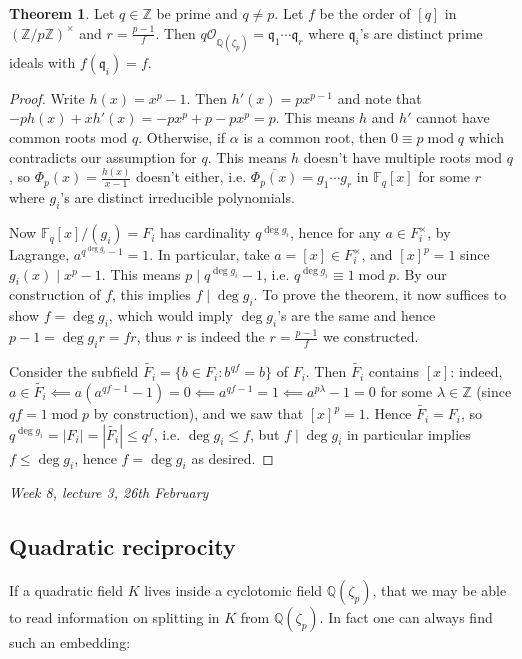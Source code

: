\documentclass{article}
\newcommand{\Z}{\mathbb{Z}}
\newcommand{\Q}{\mathbb{Q}}
\newcommand{\F}{\mathbb{F}}
\newcommand{\Mod}{\operatorname{mod}}
\newcommand{\ri}{\mathcal{O}}
\newcommand{\iq}{\mathfrak{q}}
\theoremstyle{definition}
\newtheorem{thm}[defn]{Theorem}
\begin{document}
\begin{thm}
Let $q\in\Z$ be prime and $q\neq p$. Let $f$ be the order of $[q]$ in $(\Z/p\Z)^\times$ and $r=\frac{p-1}{f}$. Then $q\ri_{\Q(\zeta_p)}=\iq_1\cdots\iq_r$ where $\iq_i$'s are distinct prime ideals with $f(\iq_i)=f$.
\end{thm}
\begin{proof}
Write $h(x)=x^p-1$. Then $h'(x)=px^{p-1}$ and note that $-ph(x)+xh'(x)=-px^p+p-px^p=p$. This means $h$ and $h'$ cannot have common roots mod $q$. Otherwise, if $\alpha$ is a common root, then $0\equiv p\Mod q$ which contradicts our assumption for $q$. This means $h$ doesn't have multiple roots mod $q$, so $\Phi_p(x)=\frac{h(x)}{x-1}$ doesn't either, i.e. $\overline{\Phi_p(x)}=g_1\cdots g_r$ in $\F_q[x]$ for some $r$ where $g_i$'s are distinct irreducible polynomials.

Now $\F_q[x]/(g_i)=F_i$ has cardinality $q^{\deg g_i}$, hence for any $a\in F_i^\times$, by Lagrange, $a^{q^{\deg g_i}-1}=1$. In particular, take $a=[x]\in F_i^\times$, and $[x]^p=1$ since $g_i(x)\mid x^p-1$. This means $p\mid q^{\deg g_i}-1$, i.e. $q^{\deg g_i}\equiv 1\Mod p$. By our construction of $f$, this implies $f\mid\deg g_i$. To prove the theorem, it now suffices to show $f=\deg g_i$, which would imply $\deg g_i$'s are the same and hence $p-1=\deg g_i r=fr$, thus $r$ is indeed the $r=\frac{p-1}{f}$ we constructed.

Consider the subfield $\widetilde{F_i}=\{b\in F_i:b^{qf}=b\}$ of $F_i$. Then $\widetilde{F_i}$ contains $[x]$: indeed, $a\in\widetilde{F_i}\impliedby a(a^{qf-1}-1)=0\impliedby a^{qf-1}=1\impliedby a^{p\lambda}-1=0$ for some $\lambda\in\Z$ (since $qf=1\Mod p$ by construction), and we saw that $[x]^p=1$. Hence $\widetilde{F_i}=F_i$, so $q^{\deg g_i}=|F_i|=|\widetilde{F_i}|\leq q^f$, i.e. $\deg g_i\leq f$, but $f\mid \deg g_i$ in particular implies $f\leq \deg g_i$, hence $f=\deg g_i$ as desired.
\end{proof}

\begin{flushright}
\textit{Week 8, lecture 3, 26th February}
\end{flushright}

\subsection{Quadratic reciprocity}
If a quadratic field $K$ lives inside a cyclotomic field $\Q(\zeta_p)$, that we may be able to read information on splitting in $K$ from $\Q(\zeta_p)$. In fact one can always find such an embedding:
\end{document}
